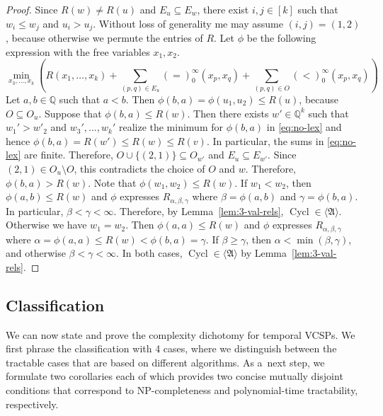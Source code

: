 \documentclass[preprint,12pt]{elsarticle}
\newcommand{\Q}{\mathbb Q}
\newcommand{\bA}{{\mathfrak A}}
\DeclareMathOperator{\Cyc}{Cycl}
\begin{document}
\begin{proof}
Since $R(w) \neq R(u)$ and $E_u \subseteq E_{w}$, there exist $i,j \in [k]$ such that $w_i \leq w_j$ and $u_i>u_j$. Without loss of generality me may assume $(i,j)=(1,2)$, because otherwise we permute the entries of $R$. Let $\phi$ be the following expression with the free variables $x_1,x_2$.  
\begin{equation} \label{eq:no-lex}
\min_{x_3, \dots, x_k} \left( R(x_1, \dots, x_k) + \sum_{(p,q) \in E_u} (=)_0^\infty(x_p,x_q) + \sum_{(p,q) \in O} (<)_0^\infty(x_p,x_q) \right) 
\end{equation}
Let $a,b \in \Q$ such that $a<b$. Then $\phi(b,a) = \phi(u_1, u_2) \leq R(u)$, because $O \subseteq O_u$. Suppose that $\phi(b,a) \leq R(w)$. Then there exists $w' \in \Q^k$
such that $w_1'>w'_2$ and $w_3', \dots, w_k'$ realize the minimum for $\phi(b,a)$ in \eqref{eq:no-lex} 
and hence $\phi(b,a)=R(w')\leq R(w)\leq R(v)$.
In particular, the sums in \eqref{eq:no-lex} are finite. Therefore, $O \cup \{(2,1)\} \subseteq O_{w'}$ and $E_u \subseteq E_{w'}$. Since $(2,1) \in O_{u} \setminus O$, this contradicts the choice of $O$ and $w$. Therefore, $\phi(b,a) > R(w)$.
Note that $\phi(w_1, w_2) \leq R(w)$. If $w_1 < w_2$, then $\phi(a,b) \leq R(w)$ and $\phi$ expresses $R_{\alpha, \beta, \gamma}$ where $\beta = \phi(a,b)$ and $\gamma=\phi(b,a)$. In particular, $\beta < \gamma < \infty$.  Therefore, by Lemma~\ref{lem:3-val-rels},
$\Cyc \in \langle \bA \rangle$.
Otherwise we have $w_1 = w_2$. Then $\phi(a,a) \leq R(w)$ and $\phi$ expresses $R_{\alpha, \beta, \gamma}$ where $\alpha = \phi(a,a) \leq R(w) < \phi(b,a) = \gamma$. If $\beta \geq \gamma$, then $\alpha < \min(\beta, \gamma)$, and otherwise $\beta < \gamma < \infty$. In both cases, $\Cyc \in \langle \bA \rangle$ by Lemma~\ref{lem:3-val-rels}.
\end{proof}


\subsection{Classification}


We can now state and prove the complexity dichotomy for temporal VCSPs. We first phrase the classification with 4 cases, where we distinguish between the tractable cases that are based on different algorithms. As a~next step, we formulate two corollaries each of which provides two concise mutually disjoint conditions that correspond to NP-completeness and polynomial-time tractability, respectively.
\end{document}

